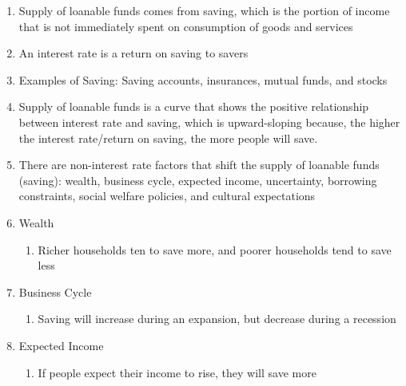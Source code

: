 \documentclass[12pt]{article}
\begin{document}
\begin{enumerate}
\begin{enumerate}
            \begin{enumerate}

              \item Supply of loanable funds comes from saving, which is the portion of income that is not immediately spent on consumption of goods and services

              \item An interest rate is a return on saving to savers

              \item Examples of Saving: Saving accounts, insurances, mutual funds, and stocks

              \item Supply of loanable funds is a curve that shows the positive relationship between interest rate and saving, which is upward-sloping because, the higher the interest rate/return on saving, the more people will save.

              \item There are non-interest rate factors that shift the supply of loanable funds (saving): wealth, business cycle, expected income, uncertainty, borrowing constraints, social welfare policies, and cultural expectations

              \item Wealth

                \begin{enumerate}

                  \item Richer households ten to save more, and poorer households tend to save less

                \end{enumerate}

              \item Business Cycle

                \begin{enumerate}

                  \item Saving will increase during an expansion, but decrease during a recession

                \end{enumerate}

              \item Expected Income

                \begin{enumerate}

                  \item If people expect their income to rise, they will save more


\end{enumerate}
\end{enumerate}
\end{enumerate}
\end{enumerate}
\end{document}
